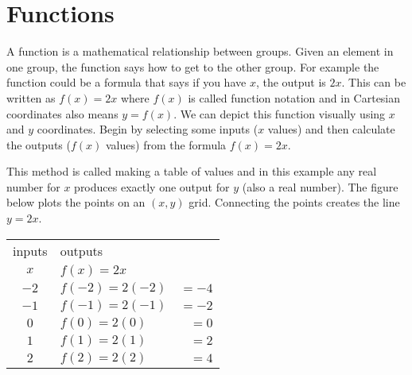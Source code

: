 \section{Functions}\label{sec:functions}	
A function is a mathematical relationship between groups. Given an element in one group, the function says how to get to the other group. For example the function could be a formula that says if you have $x$, the output is $2x$. This can be written as $f(x)=2x$ where $f(x)$ is called function notation and in Cartesian coordinates also means $y=f(x)$. We can depict this function visually using $x$ and $y$ coordinates. Begin by selecting some inputs ($x$ values) and then calculate the outputs ($f(x)$ values) from the formula $f(x)=2x$.

This method is called making a table of values and in this example any real number for $x$ produces exactly one output for $y$ (also a real number). The figure below plots the points on an $(x,y)$ grid. Connecting the points creates the line $y=2x$.

\begin{multicols}{2}
\begin{center}
\begin{tabular}{clr}  
	\toprule
	inputs&outputs&\\
$x$&$f(x)=2x$& \\
	\midrule
	$-2$    & $f(-2)=2(-2)$&$=-4$\\
	\midrule
$-1$ & $f(-1)=2(-1)$&$=-2$ \\
\midrule
$0$ & $f(0)=2(0)$&$=0$ \\
\midrule
$1$ & $f(1)=2(1)$&$=2$ \\
\midrule
$2$ & $f(2)=2(2)$&$=4$ \\
	\bottomrule
\end{tabular}
\end{center}
\columnbreak
\begin{center}
\end{center}
\end{multicols}

